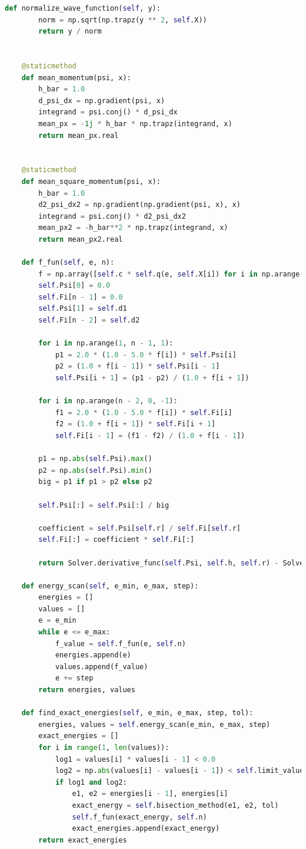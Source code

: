 \documentclass[a4paper,12pt]{article}
\begin{document}
\begin{lstlisting}[language=Python, caption=Код файла solver.py,label={lst:solver}]
    def normalize_wave_function(self, y):
        norm = np.sqrt(np.trapz(y ** 2, self.X))
        return y / norm


    @staticmethod
    def mean_momentum(psi, x):
        h_bar = 1.0
        d_psi_dx = np.gradient(psi, x)
        integrand = psi.conj() * d_psi_dx
        mean_px = -1j * h_bar * np.trapz(integrand, x)
        return mean_px.real


    @staticmethod
    def mean_square_momentum(psi, x):
        h_bar = 1.0
        d2_psi_dx2 = np.gradient(np.gradient(psi, x), x)
        integrand = psi.conj() * d2_psi_dx2
        mean_px2 = -h_bar**2 * np.trapz(integrand, x)
        return mean_px2.real

    def f_fun(self, e, n):
        f = np.array([self.c * self.q(e, self.X[i]) for i in np.arange(n)])
        self.Psi[0] = 0.0
        self.Fi[n - 1] = 0.0
        self.Psi[1] = self.d1
        self.Fi[n - 2] = self.d2

        for i in np.arange(1, n - 1, 1):
            p1 = 2.0 * (1.0 - 5.0 * f[i]) * self.Psi[i]
            p2 = (1.0 + f[i - 1]) * self.Psi[i - 1]
            self.Psi[i + 1] = (p1 - p2) / (1.0 + f[i + 1])

        for i in np.arange(n - 2, 0, -1):
            f1 = 2.0 * (1.0 - 5.0 * f[i]) * self.Fi[i]
            f2 = (1.0 + f[i + 1]) * self.Fi[i + 1]
            self.Fi[i - 1] = (f1 - f2) / (1.0 + f[i - 1])

        p1 = np.abs(self.Psi).max()
        p2 = np.abs(self.Psi).min()
        big = p1 if p1 > p2 else p2

        self.Psi[:] = self.Psi[:] / big

        coefficient = self.Psi[self.r] / self.Fi[self.r]
        self.Fi[:] = coefficient * self.Fi[:]

        return Solver.derivative_func(self.Psi, self.h, self.r) - Solver.derivative_func(self.Fi, self.h, self.r)

    def energy_scan(self, e_min, e_max, step):
        energies = []
        values = []
        e = e_min
        while e <= e_max:
            f_value = self.f_fun(e, self.n)
            energies.append(e)
            values.append(f_value)
            e += step
        return energies, values

    def find_exact_energies(self, e_min, e_max, step, tol):
        energies, values = self.energy_scan(e_min, e_max, step)
        exact_energies = []
        for i in range(1, len(values)):
            log1 = values[i] * values[i - 1] < 0.0
            log2 = np.abs(values[i] - values[i - 1]) < self.limit_value
            if log1 and log2:
                e1, e2 = energies[i - 1], energies[i]
                exact_energy = self.bisection_method(e1, e2, tol)
                self.f_fun(exact_energy, self.n)
                exact_energies.append(exact_energy)
        return exact_energies


\end{lstlisting}
\end{document}
